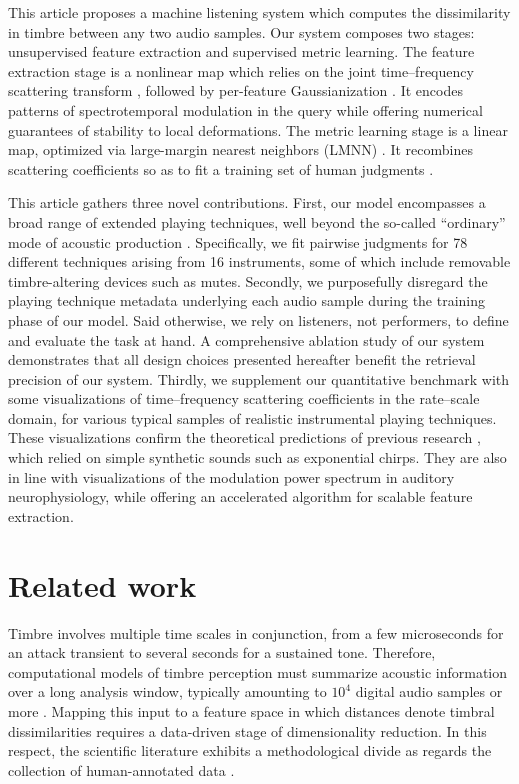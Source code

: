 \documentclass{bmcart}
\begin{document}
This article proposes a machine listening system which computes the dissimilarity in timbre between any two audio samples.
Our system composes two stages: unsupervised feature extraction and supervised metric learning.
The feature extraction stage is a nonlinear map which relies on the joint time--frequency scattering transform \cite{anden2015mlsp}, followed by per-feature Gaussianization \cite{lostanlen2018jasmp}.
It encodes patterns of spectrotemporal modulation in the query while offering numerical guarantees of stability to local deformations.
The metric learning stage is a linear map, optimized via large-margin nearest neighbors (LMNN) \cite{weinberger2009distance}.
It recombines scattering coefficients so as to fit a training set of human judgments \cite{mcadams1995psychres}.


This article gathers three novel contributions.
First, our model encompasses a broad range of extended playing techniques, well beyond the so-called ``ordinary'' mode of acoustic production \cite{lostanlen2018extended}.
Specifically, we fit pairwise judgments for 78 different techniques arising from 16 instruments, some of which include removable timbre-altering devices such as mutes.
Secondly, we purposefully disregard the playing technique metadata underlying each audio sample during the training phase of our model.
Said otherwise, we rely on listeners, not performers, to define and evaluate the task at hand.
A comprehensive ablation study of our system demonstrates that all design choices presented hereafter benefit the retrieval precision of our system.
Thirdly, we supplement our quantitative benchmark with some visualizations of time--frequency scattering coefficients in the rate--scale domain, for various typical samples of realistic instrumental playing techniques.
These visualizations confirm the theoretical predictions of previous research \cite{anden2015mlsp}, which relied on simple synthetic sounds such as exponential chirps.
They are also in line with visualizations of the modulation power spectrum in auditory neurophysiology, while offering an accelerated algorithm for scalable feature extraction.




\section*{Related work}
Timbre involves multiple time scales in conjunction, from a few microseconds for an attack transient to several seconds for a sustained tone.
Therefore, computational models of timbre perception must summarize acoustic information over a long analysis window, typically amounting to $10^{4}$ digital audio samples or more \cite{joder2009taslp}.
Mapping this input to a feature space in which distances denote timbral dissimilarities requires a data-driven stage of dimensionality reduction.
In this respect, the scientific literature exhibits a methodological divide as regards the collection of human-annotated data \cite{siedenburg2016jnmr}.
\end{document}
